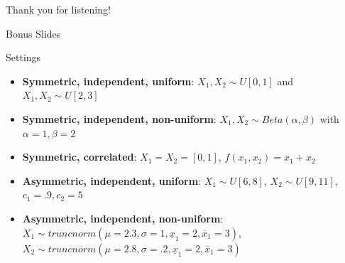 \documentclass[aspectratio=169,xcolor=dvipsnames]{beamer}
\begin{document}
\begin{frame}

    \vspace{10mm}
    {\Large{\centerline{Thank you for listening!}}}

\end{frame}




\begin{frame}

    \vspace{10mm}
    {\Large{\centerline{Bonus Slides}}}

\end{frame}

\begin{frame}{Settings}

\begin{itemize}
    \item \textbf{Symmetric, independent, uniform}: $X_1,X_2 \sim U[0,1]$ and $X_1,X_2 \sim U[2,3]$ \autocite{pavlov2011optimal}
    \item \textbf{Symmetric, independent, non-uniform}: $X_1,X_2 \sim Beta(\alpha,\beta)$ with $\alpha=1, \beta=2$ \autocite{daskalakis2017strong}
    \item \textbf{Symmetric, correlated}: $X_1 = X_2 = [0,1]$, $f(x_1,x_2) = x_1 + x_2$
    \item \textbf{Asymmetric, independent, uniform}: $X_1 \sim U[6,8]$, $X_2 \sim U[9,11]$, $c_1 = .9, c_2 = 5$ \autocite{belloni2010multidimensional}
    \item \textbf{Asymmetric, independent, non-uniform}: $X_1 \sim truncnorm(\mu=2.3,\sigma=1,\underline{x}_1=2,\overline{x}_1=3)$, $X_2 \sim truncnorm(\mu=2.8,\sigma=.2,\underline{x}_1=2,\overline{x}_1=3)$
\end{itemize}

\end{frame}




\end{document}
